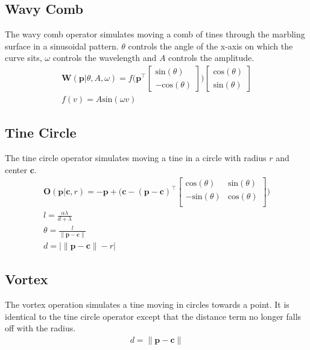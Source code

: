 \documentclass{article}
\newcommand{\cb}{\boldsymbol{c}}
\newcommand{\pb}{\boldsymbol{p}}
\renewcommand{\sin}{\text{sin}}
\renewcommand{\cos}{\text{cos}}
\begin{document}
\subsection{Wavy Comb}
The wavy comb operator simulates moving a comb of tines through the marbling surface in a sinusoidal pattern. $\theta$ controls the angle of the x-axis on which the curve sits, $\omega$ controls the wavelength and $A$ controls the amplitude.
\begin{gather*}
	\boldsymbol{W}(\pb| \theta, A, \omega) = f\bigg(\pb^\top \begin{bmatrix}
	\sin(\theta)\\
	 -\cos(\theta)
	\end{bmatrix}\bigg) \begin{bmatrix}
	\cos(\theta)\\
	 \sin(\theta)
	\end{bmatrix}\\
    f(v) = A \sin(\omega v)
\end{gather*}

\subsection{Tine Circle}
The tine circle operator simulates moving a tine in a circle with radius $r$ and center $\cb$.
\begin{gather*}
	\boldsymbol{O}(\pb | \cb, r) =  -\pb + \bigg(\cb - (\pb - \cb) ^ \top \begin{bmatrix}
	\cos(\theta) &\sin(\theta)\\
	-\sin(\theta) &\cos(\theta)\\
	\end{bmatrix} \bigg)\\
	l = \frac{\alpha \lambda}{d + \lambda}\\
	\theta = \frac{l}{\lVert\pb - \cb\rVert}\\
    d = |\lVert \pb - \cb\rVert - r|
\end{gather*}

\subsection{Vortex}
The vortex operation simulates a tine moving in circles towards a point. It is identical to the tine circle operator except that the distance term no longer falls off with the radius.
\begin{gather*}
	d = \lVert\pb - \cb\rVert
\end{gather*}
\end{document}
